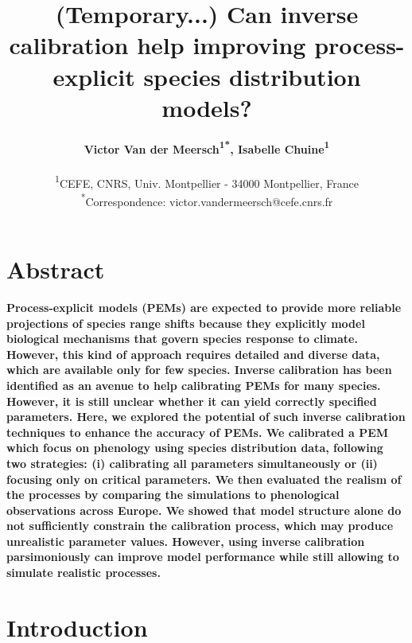 \documentclass[letterpaper,8pt]{extarticle}  %
\title{(Temporary...) Can inverse calibration help improving process-explicit species distribution models?}
\author{%
\textbf{Victor Van der Meersch\textcolor{Accent}{\textsuperscript{1*}}, %
Isabelle Chuine\textcolor{Accent}{\textsuperscript{1}} %
}\\
\begin{small}\textcolor{Accent}{\textsuperscript{1}}CEFE, CNRS, Univ. Montpellier - 34000 Montpellier, France \\ 
\textcolor{Accent}{\textsuperscript{*}}Correspondence: \textcolor{Accent}{victor.vandermeersch@cefe.cnrs.fr} \\ \end{small}
}
\date{}
\begin{document}
\maketitle

\section*{Abstract}

\begin{doublespacing}
\begin{linenumbers}

\noindent
\textbf{
Process-explicit models (PEMs) are expected to provide more reliable projections of species range shifts because they explicitly model biological mechanisms that govern species response to climate.
However, this kind of approach requires detailed and diverse data, which are available only for few species. 
Inverse calibration has been identified as an avenue to help calibrating PEMs for many species. However, it is still unclear whether it can yield correctly specified parameters.
Here, we explored the potential of such inverse calibration techniques to enhance the accuracy of PEMs. We calibrated a PEM which focus on phenology using species distribution data, following two strategies: (i) calibrating all parameters simultaneously or (ii) focusing only on critical parameters. We then evaluated the realism of the processes by comparing the simulations to phenological observations across Europe. 
We showed that model structure alone do not sufficiently constrain the calibration process, which may produce unrealistic parameter values. However, using inverse calibration parsimoniously can improve model performance while still allowing to simulate realistic processes.
}

\section{Introduction}




\end{linenumbers}
\end{doublespacing}
\end{document}
